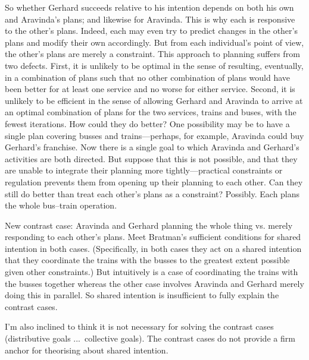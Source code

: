 \documentclass[12pt,\papersize]{extarticle}
\begin{document}
So whether Gerhard succeeds relative to his intention depends on both his own and Aravinda's plans; and likewise for Aravinda.
This is why each is responsive to the other's plans. 
Indeed, each may even try to predict changes in the other's plans and modify their own accordingly.  
But from each individual's point of view, the other's plans are  merely a constraint.
This approach to planning suffers from two defects.
First, it is unlikely to be optimal in the sense of resulting, eventually, in a combination of plans such that no other combination of plans would have been better for at least one service and no worse for either service.
Second, it is unlikely to be efficient in the sense of allowing Gerhard and Aravinda to arrive at an optimal combination of plans for the two services, trains and buses, with the fewest iterations.
How could they do better?
One possibility may be to have a single plan covering busses and trains---perhaps, for example, Aravinda could buy Gerhard's franchise. 
Now there is a single goal to which Aravinda and Gerhard's activities are both directed.
But suppose that this is not possible, and that they are unable to integrate their planning more tightly---practical constraints or regulation prevents them from opening up their planning to each other.
Can they still do better than treat each other's plans as a constraint?
Possibly.
Each plans the whole bus--train operation. 

New contrast case: Aravinda and Gerhard planning the whole thing vs. merely responding to each other's plans.
Meet Bratman's sufficient conditions for shared intention in both cases.
(Specifically, in both cases they act on a shared intention that they coordinate the trains with the busses to the greatest extent possible given other constraints.)
But intuitively is a case of coordinating the trains with the busses together whereas the other case involves Aravinda and Gerhard merely doing this in parallel.
So shared intention is insufficient to fully explain the contrast cases.

I'm also inclined to think it is not necessary for solving the contrast cases (distributive goals ...\ collective goals).
The contrast cases do not provide a firm anchor for theorising about shared intention.




\end{document}
